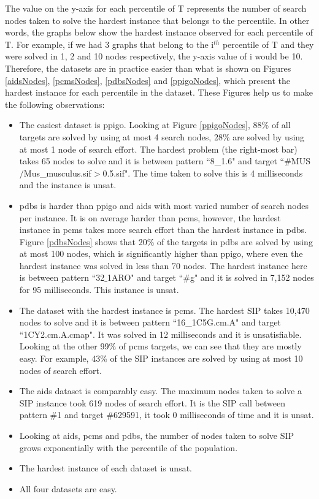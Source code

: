 \documentclass{l4proj}
\newcounter{example}[section]
\begin{document}
The value on the y-axis for each percentile of T represents the number of search nodes taken to solve the hardest instance that belongs to the percentile. In other words, the graphs below show the hardest instance observed for each percentile of T. For example, if we had 3 graphs that belong to the i$^{th}$ percentile of T and they were solved in 1, 2 and 10 nodes respectively, the y-axis value of i would be 10. Therefore, the datasets are in practice easier than what is shown on Figures \ref{aidsNodes}, \ref{pcmsNodes}, \ref{pdbsNodes} and \ref{ppigoNodes}, which present the hardest instance for each percentile in the dataset. These Figures help us to make the following observations:
\begin{itemize}
\item The easiest dataset is ppigo. Looking at Figure \ref{ppigoNodes}, 88\% of all targets are solved by using at most 4 search nodes, 28\% are solved by using at most 1 node of search effort. The hardest problem (the right-most bar) takes 65 nodes to solve and it is between pattern ``8\_1.6" and target ``\#MUS$/$Mus\_musculus.sif$>$0.5.sif". The time taken to solve this is 4 milliseconds and the instance is \gls{unsat}.

\item pdbs is harder than ppigo and aids with most varied number of search nodes per instance. It is on average harder than pcms, however, the hardest instance in pcms takes more search effort than the hardest instance in pdbs. Figure \ref{pdbsNodes} shows that 20\% of the targets in pdbs are solved by using at most 100 nodes, which is significantly higher than ppigo, where even the hardest instance was solved in less than 70 nodes. The hardest instance here is between pattern ``32$\_$1ARO" and target ``\#g" and it is solved in 7,152 nodes for 95 milliseconds. This instance is \gls{unsat}. 

\item The dataset with the hardest instance is pcms. The hardest SIP takes 10,470 nodes to solve and it is between pattern ``16\_1C5G.cm.A" and target ``1CY2.cm.A.cmap". It was solved in 12 milliseconds and it is unsatisfiable. Looking at the other 99\% of pcms targets, we can see that they are mostly easy. For example, 43\% of the SIP instances are solved by using at most 10 nodes of search effort.

\item The aids dataset is comparably easy. The maximum nodes taken to solve a SIP instance took 619 nodes of search effort. It is the SIP call between pattern \#1 and target \#629591, it took 0 milliseconds of time and it is \gls{unsat}.

\item Looking at aids, pcms and pdbs, the number of nodes taken to solve SIP grows exponentially with the percentile of the population.

\item The hardest instance of each dataset is \gls{unsat}.

\item All four datasets are easy.
\end{itemize}
\end{document}
